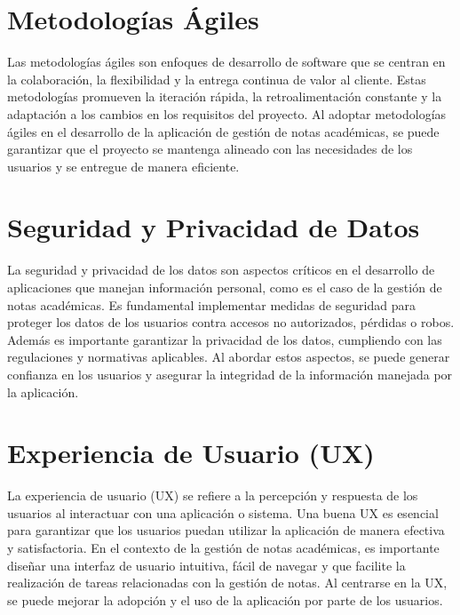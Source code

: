 \vspace{1cm}
\section{Metodologías Ágiles}
Las metodologías ágiles son enfoques de desarrollo de software que se centran en la colaboración, la flexibilidad y la entrega continua de valor al cliente. Estas metodologías promueven la iteración rápida, la retroalimentación constante y la adaptación a los cambios en los requisitos del proyecto. Al adoptar metodologías ágiles en el desarrollo de la aplicación de gestión de notas académicas, se puede garantizar que el proyecto se mantenga alineado con las necesidades de los usuarios y se entregue de manera eficiente.\cite{user_metodologias_2024}

\vspace{1cm}
\section{Seguridad y Privacidad de Datos}
La seguridad y privacidad de los datos son aspectos críticos en el desarrollo de aplicaciones que manejan información personal, como es el caso de la gestión de notas académicas. Es fundamental implementar medidas de seguridad para proteger los datos de los usuarios contra accesos no autorizados, pérdidas o robos. Además  
es importante garantizar la privacidad de los datos, cumpliendo con las regulaciones y normativas aplicables. Al abordar estos aspectos, se puede generar confianza en los usuarios y asegurar la integridad de la información manejada por la aplicación.\cite{noauthor_privacidad_nodate}  

\vspace{1cm}
\section{Experiencia de Usuario (UX)}
La experiencia de usuario (UX) se refiere a la percepción y respuesta de los usuarios al interactuar con una aplicación o sistema. Una buena UX es esencial para garantizar que los usuarios puedan utilizar la aplicación de manera efectiva y satisfactoria. En el contexto de la gestión de notas académicas, es importante diseñar una interfaz de usuario intuitiva, fácil de navegar y que facilite la realización de tareas relacionadas con la gestión de notas. Al centrarse en la UX, se puede mejorar la adopción y el uso de la aplicación por parte de los usuarios.\cite{ux}  
\vspace{1cm}
